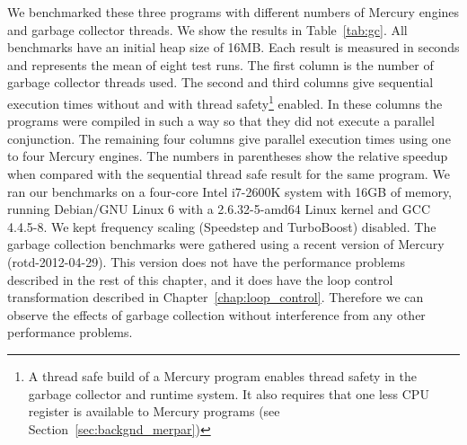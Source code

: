 We benchmarked these three programs with different numbers of Mercury
engines and garbage collector threads.
We show the results in Table~\ref{tab:gc}.
All benchmarks have an initial heap size of 16MB.
Each result is measured in seconds and represents the mean of eight test runs.
The first column is the number of garbage collector threads used.
The second and third columns give sequential execution times
without and with thread safety\footnote{
    A thread safe build of a Mercury program enables thread safety in the
    garbage collector and runtime system.
    It also requires that one less CPU register is available to Mercury
    programs (see Section~\ref{sec:backgnd_merpar})}
enabled.
In these columns the programs were compiled in such a way so that they did
not execute a parallel conjunction.
The remaining four columns give parallel execution times using one to four
Mercury engines.
The numbers in parentheses show the relative speedup when compared with the
sequential thread safe result for the same program.
\label{cabsav}
We ran our benchmarks on
a four-core Intel i7-2600K system
with 16GB of memory,
running Debian/GNU Linux 6
with a 2.6.32-5-amd64 Linux kernel and GCC 4.4.5-8.
We kept frequency scaling (Speedstep and TurboBoost) disabled.
The garbage collection benchmarks were gathered using a recent version of
Mercury (rotd-2012-04-29).
This version does not have the performance problems described in the
rest of this chapter,
and it does have the loop control transformation described
in Chapter~\ref{chap:loop_control}.
Therefore we can observe the effects of garbage collection without
interference from any other performance problems.

